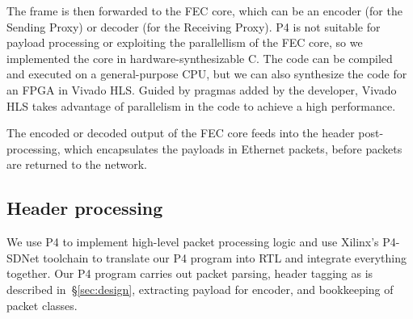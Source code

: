 The frame is then forwarded to the FEC core, which can be an encoder (for the Sending Proxy) or decoder (for the
Receiving Proxy).
P4 is not suitable
for
payload processing or
exploiting the parallellism of the FEC core, so we implemented the core in
hardware-synthesizable C. The code can be compiled and executed on a
general-purpose CPU, but we can also synthesize the code for an FPGA
in Vivado HLS.  Guided by pragmas added by the developer, Vivado HLS takes
advantage of parallelism in the code to achieve a high performance.

The encoded or decoded output of the FEC core feeds into the header
post-processing, which encapsulates the payloads in Ethernet packets, before packets are returned to the network.

\subsection{Header processing}
\label{sec:impl:header-processing}
We use P4 to implement high-level packet processing logic and
use Xilinx's P4-SDNet toolchain to translate our P4 program into RTL
and integrate everything together.
%
%
%
%
Our P4 program carries out packet parsing, header tagging as is
described in~\S\ref{sec:design}, extracting payload for encoder, and
bookkeeping of packet classes.

